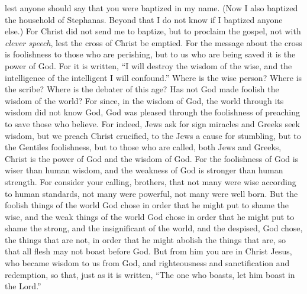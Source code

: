 \begin{biblechapter}
\verse lest anyone should say that you were baptized in my name.
\verse (Now I also baptized the household of Stephanas. Beyond that I do not know if I baptized anyone else.)
\verse For Christ did not send me to baptize, but to proclaim the gospel, not with \textit{clever speech}, lest the cross of Christ be emptied.
 For the message about the cross is foolishness to those who are perishing, but to us who are being saved it is the power of God.
\verse For it is written, “I will destroy the wisdom of the wise, 
and the intelligence of the intelligent I will confound.”
\verse Where is the wise person? Where is the scribe? Where is the debater of this age? Has not God made foolish the wisdom of the world?
\verse For since, in the wisdom of God, the world through its wisdom did not know God, God was pleased through the foolishness of preaching to save those who believe.
\verse For indeed, Jews ask for sign miracles and Greeks seek wisdom,
\verse but we preach Christ crucified, to the Jews a cause for stumbling, but to the Gentiles foolishness,
\verse but to those who are called, both Jews and Greeks, Christ is the power of God and the wisdom of God.
\verse For the foolishness of God is wiser than human wisdom, and the weakness of God is stronger than human strength.
 For consider your calling, brothers, that not many were wise according to human standards, not many were powerful, not many were well born.
\verse But the foolish things of the world God chose in order that he might put to shame the wise, and the weak things of the world God chose in order that he might put to shame the strong,
\verse and the insignificant of the world, and the despised, God chose, the things that are not, in order that he might abolish the things that are,
\verse so that all flesh may not boast before God.
\verse But from him you are in Christ Jesus, who became wisdom to us from God, and righteousness and sanctification and redemption,
\verse so that, just as it is written, “The one who boasts, let him boast in the Lord.”
\end{biblechapter}

